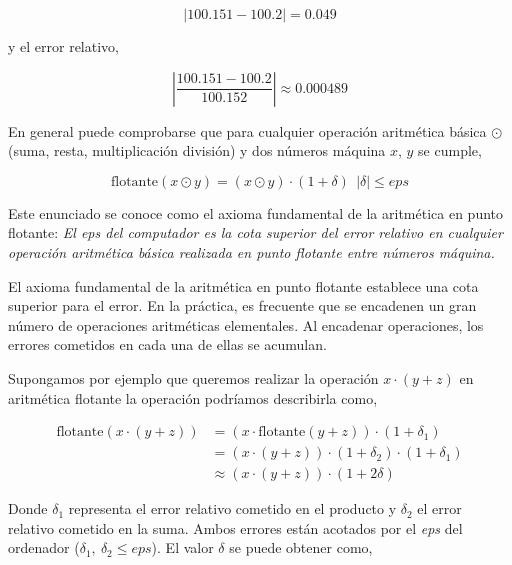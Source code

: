 \begin{equation*}
\vert 100.151-100.2 \vert=0.049
\end{equation*}
\begin{paracol}{2}
y el error relativo,
\end{paracol}
\begin{equation*}
\left\vert\frac{100.151-100.2 }{100.152}\right\vert\approx 0.000489
\end{equation*}
\begin{paracol}{2}
En general puede comprobarse que para cualquier operación aritmética básica $\odot \ $(suma, resta, multiplicación división) y dos números máquina $x$, $y$ se cumple,
\end{paracol}
\begin{equation*}
\text{flotante}(x\odot y)=(x\odot y)\cdot(1+\delta) \ \ \vert \delta \vert \leq eps
\end{equation*}
\begin{paracol}{2}
Este enunciado se conoce como el axioma fundamental de la aritmética en punto flotante:\emph{ El eps del computador es la cota superior del error relativo en cualquier operación aritmética básica realizada en punto flotante entre números máquina.} 

El axioma fundamental de la aritmética en punto flotante establece una cota superior para el error. En la práctica, es frecuente que se encadenen un gran número de operaciones aritméticas elementales. Al encadenar operaciones, los errores cometidos en cada una de ellas se acumulan.

Supongamos por ejemplo que queremos realizar la operación $x\cdot(y+z)$ en aritmética flotante la operación podríamos describirla como,
\end{paracol}

\begin{align*}
\text{flotante}\left(x\cdot (y+z)\right)& =\left(x\cdot\text{flotante}(y+z)\right)\cdot(1+\delta_1)\\
 & = (x\cdot(y+z))\cdot(1+\delta_2)\cdot(1+\delta_1)\\
 & \approx (x\cdot(y+z))\cdot(1+2\delta)
\end{align*}

\begin{paracol}{2}
Donde $\delta_1$ representa el error relativo cometido en el producto y $\delta_2$ el error relativo cometido en la suma. Ambos errores están acotados por el \emph{eps} del ordenador ($\delta_1, \ \delta_2 \leq eps$). El valor $\delta$ se puede obtener como,
\end{paracol}

